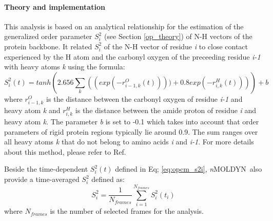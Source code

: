 \documentclass[a4paper,11pt]{report}
\newcommand{\NMOLDYN}{\textit{n}MOLDYN}
\begin{document}
\paragraph{Theory and implementation\\}
\label{opcm_theory}
This analysis is based on an analytical relationship for the estimation of the generalized order parameter $S^2_i$ 
(see Section \ref{op_theory}) of N-H vectors of the protein backbone. It related $S^2_i$ of the N-H vector of residue 
\textit{i} to close contact experienced by the H atom and the carbonyl oxygen of the preceeding residue \textit{i-1} 
with heavy atoms \textit{k} using the formula:
\begin{equation}
\label{eq:opcm_s2i}
S^2_i(t) = tanh\left(2.656\sum_k \left((exp(-r^O_{i-1,k}(t)))) + 0.8exp(-r^H_{i,k}(t))\right)\right) + b
\end{equation}
where $r^O_{i-1,k}$ is the distance between the carbonyl oxygen of residue \textit{i-1} and heavy atom \textit{k} and $r^H_{i,k}$ is 
the distance between the amide proton of residue \textit{i} and heavy atom \textit{k}. The parameter \textit{b} is set to -0.1 which takes into account that order 
parameters of rigid protein regions typically lie around 0.9. The sum ranges over all heavy atoms \textit{k} that do not belong to amino 
acids \textit{i} and \textit{i-1}. For more details about this method, please refer to Ref. \cite{Bruschweiler}

Beside the time-dependent $S^2_i(t)$ defined in Eq; \ref{eq:opcm_s2i}, \NMOLDYN\ also provide a time-averaged $S^2_i$ defined as:
\begin{equation}
\label{eq:opcm_s2i_avg}
S^2_i = \frac{1}{N_{frames}}\sum_{i=1}^{N_{frames}} S^2_i(t_i)
\end{equation}
where $N_{frames}$ is the number of selected frames for the analysis.
\end{document}
